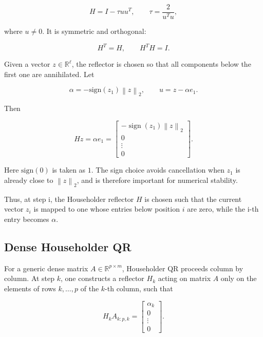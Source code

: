 \documentclass[11pt,a4paper]{article}
\newcommand{\R}{\mathbb{R}}
\newcommand{\norm}[1]{\left\|#1\right\|}
\begin{document}
\begin{equation}
\label{eq:householder_def}
    H = I - \tau uu^T,
    \qquad
    \tau = \frac{2}{u^T u},
\end{equation}

where $u\neq 0$. It is symmetric and orthogonal:

\begin{equation}
    H^T = H,
    \qquad
    H^T H = I.
\end{equation}

Given a vector $z\in\R^\ell$, the reflector is chosen so that all components below the 
first one are annihilated. Let

\begin{equation}
    \alpha = -\text{sign}(z_1)\norm{z}_2,
    \qquad
    u = z - \alpha e_1.
\end{equation}

Then

\begin{equation}
    Hz = \alpha e_1
    = 
    \begin{bmatrix}
        -\operatorname{sign}(z_1)\norm{z}_2 \\
        0 \\
        \vdots \\
        0
    \end{bmatrix}.
\end{equation}

Here $\text{sign}(0)$ is taken as $1$. The sign choice avoids cancellation when $z_1$ is 
already close to $\norm{z}_2$, and is therefore important for numerical stability.

Thus, at step i, the Householder reflector $H$ is chosen such that the current vector $z_i$ is mapped to one whose entries below position $i$ are zero, while the i-th entry becomes $\alpha$.

\subsection{Dense Householder QR}

For a generic dense matrix $A\in\R^{p\times m}$, Householder QR proceeds column by 
column. At step $k$, one constructs a reflector $H_k$ acting on matrix $A$ only on the elements of rows $k,\ldots,p$ of the $k$-th column, such that

\begin{equation}
    H_k A_{k:p,k}
    =
    \begin{bmatrix}
        \alpha_k \\ 0 \\ \vdots \\ 0
    \end{bmatrix}.
\end{equation}
\end{document}
